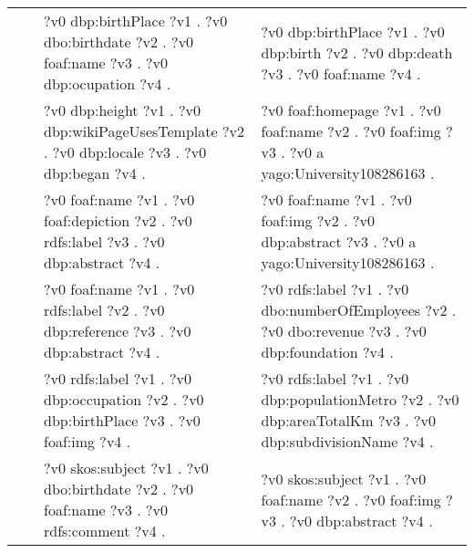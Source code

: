 \begin{table}
{\begin{tabular}{!{\color{white}\vrule}l!{\color{white}\vrule}c@{\hs}!{\color{white}\vrule}p{11.5cm}!{\color{white}\vrule}p{11.5cm}!{\color{white}\vrule}}
			 &  \phantom{a} &     ?v0 dbp:birthPlace ?v1 .  ?v0 dbo:birthdate ?v2 .  ?v0 foaf:name ?v3 .  ?v0 dbp:ocupation ?v4 . &  ?v0 dbp:birthPlace ?v1 .  ?v0 dbp:birth ?v2 .  ?v0 dbp:death ?v3 .  ?v0 foaf:name ?v4 . \\
			 &  \phantom{a} &     ?v0 dbp:height ?v1 .  ?v0 dbp:wikiPageUsesTemplate ?v2 .  ?v0 dbp:locale ?v3 .  ?v0 dbp:began ?v4 . &  ?v0 foaf:homepage ?v1 .  ?v0 foaf:name ?v2 .  ?v0 foaf:img ?v3 .  ?v0 a yago:University108286163 . \\
			 &  \phantom{a} &     ?v0 foaf:name ?v1 .  ?v0 foaf:depiction ?v2 .  ?v0 rdfs:label ?v3 .  ?v0 dbp:abstract ?v4 . &  ?v0 foaf:name ?v1 .  ?v0 foaf:img ?v2 .  ?v0 dbp:abstract ?v3 .  ?v0 a yago:University108286163 . \\
			 &  \phantom{a} &     ?v0 foaf:name ?v1 .  ?v0 rdfs:label ?v2 .  ?v0 dbp:reference ?v3 .  ?v0 dbp:abstract ?v4 . &  ?v0 rdfs:label ?v1 .  ?v0 dbo:numberOfEmployees ?v2 .  ?v0 dbo:revenue ?v3 .  ?v0 dbp:foundation ?v4 . \\
			 &  \phantom{a} &     ?v0 rdfs:label ?v1 .  ?v0 dbp:occupation ?v2 .  ?v0 dbp:birthPlace ?v3 .  ?v0 foaf:img ?v4 . &  ?v0 rdfs:label ?v1 .  ?v0 dbp:populationMetro ?v2 .  ?v0 dbp:areaTotalKm ?v3 .  ?v0 dbp:subdivisionName ?v4 . \\
			 &  \phantom{a} &     ?v0 skos:subject ?v1 .  ?v0 dbo:birthdate ?v2 .  ?v0 foaf:name ?v3 .  ?v0 rdfs:comment ?v4 . &  ?v0 skos:subject ?v1 .  ?v0 foaf:name ?v2 .  ?v0 foaf:img ?v3 .  ?v0 dbp:abstract ?v4 . \\


\end{tabular}}
\end{table}
